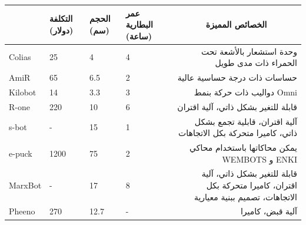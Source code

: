 \begin{table}[]
	\begin{tabular}{@{}lp{10pt}p{10pt}p{10pt}r@{}}
		\toprule
		& التكلفة (دولار)          & الحجم (سم)               & عمر البطارية (ساعة)   & \multicolumn{1}{c}{الخصائص المميزة}                                                     \\ \midrule
		Colias \cite{c5}   & 25                      & 4                        & 4                     & وحدة استشعار بالأشعة تحت الحمراء ذات مدى   طويل                                         \\
		AmiR \cite{c5}    & 65                      & 6.5                      & 2                     & حساسات ذات درجة حساسية عالية                                                            \\
		Kilobot \cite{c6}  & 14                      & 3.3                      & 3                  & دواليب ذات حركة بنمط Omni                                                               \\
		R-one \cite{c7}     & 220                     & 10                       & 6                     & قابلة للتغير بشكل ذاتي، آلية اقتران                                                     \\
		s-bot \cite{c8}    & -                       & 15                       & 1                     & آلية اقتران، قابلية تجمع بشكل ذاتي،   كاميرا متحركة بكل الاتجاهات                       \\
		e-puck \cite{c9}    & 1200                    & 75                       & 2                     & يمكن محاكاتها باستخدام محاكي WEMBOTS و ENKI                                             \\
		MarxBot \cite{c10}  & -                       & 17                       & 8                     & قابلة للتغير بشكل ذاتي، آلية اقتران،   كاميرا متحركة بكل الاتجاهات، تصميم ببنية معيارية \\
		Pheeno \cite{c11}   & \multicolumn{1}{l}{270} & \multicolumn{1}{l}{12.7} & \multicolumn{1}{l}{-} & آلية قبض، كاميرا                                                                        \\ \bottomrule
	\end{tabular}
\end{table}
